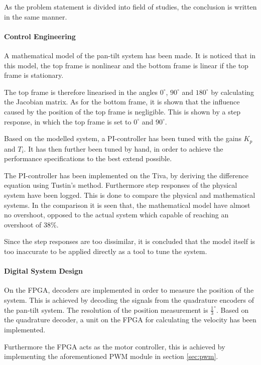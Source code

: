 \documentclass[../../main]{subfiles}
\begin{document}
As the problem statement is divided into field of studies, the conclusion is written in the same manner.

\paragraph{Control Engineering}

A mathematical model of the pan-tilt system has been made.
It is noticed that in this model, the top frame is nonlinear and the bottom frame is linear if the top frame is stationary.

The top frame is therefore linearised in the angles $0^\circ$, $90^\circ$ and $180^\circ$ by calculating the Jacobian matrix.
As for the bottom frame, it is shown that the influence caused by the position of the top frame is negligible. This is shown by a step response, in which the top frame is set to $0^\circ$ and $90^\circ$.



Based on the modelled system, a PI-controller has been tuned with the gains $K_p$ and $T_i$. It has then further been tuned by hand, in order to achieve the performance specifications to the best extend possible.

The PI-controller has been implemented on the Tiva, by deriving the difference equation using Tustin's method.
Furthermore step responses of the physical system have been logged. This is done to compare the physical and mathematical systems.
In the comparison it is seen that, the mathematical model have almost no overshoot, opposed to the actual system which capable of reaching an overshoot of 38\%.

Since the step responses are too dissimilar, it is concluded that the model itself is too inaccurate to be applied directly as a tool to tune the system. 

\paragraph{Digital System Design}
On the FPGA, decoders are implemented in order to measure the position of the system.
This is achieved by decoding the signals from the quadrature encoders of the pan-tilt system.
The resolution of the position measurement is $\frac{1}{3}^\circ$.
Based on the quadrature decoder, a unit on the FPGA for calculating the velocity has been implemented.

Furthermore the FPGA acts as the motor controller, this is achieved by implementing the aforementioned PWM module in section \ref{sec:pwm}.
\end{document}
